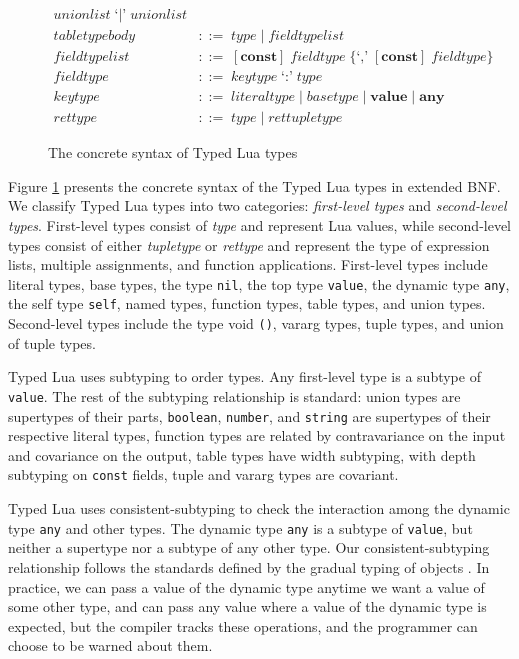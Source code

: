 \begin{figure}[!ht]
\begin{align*}
  \textit{unionlist} \; \texttt{`|'} \; \textit{unionlist}\\
\textit{tabletypebody} & ::= \; \textit{type} \; | \; \textit{fieldtypelist}\\
\textit{fieldtypelist} & ::= \; [\textbf{const}] \; \textit{fieldtype} \; \{\texttt{`,'} \; [\textbf{const}] \; \textit{fieldtype}\}\\ 
\textit{fieldtype} & ::= \; \textit{keytype} \; \texttt{`:'} \; \textit{type}\\
\textit{keytype} & ::= \; \textit{literaltype} \; | \;
  \textit{basetype} \; | \;
  \textbf{value} \; | \;
  \textbf{any}\\
\textit{rettype} & ::= \; \textit{type} \; | \; \textit{rettupletype}
\end{align*}
\dend
\caption{The concrete syntax of Typed Lua types}
\label{fig:types}
\end{figure}

Figure \ref{fig:types} presents the concrete syntax of the
Typed Lua types in extended BNF.
We classify Typed Lua types into two categories:
\emph{first-level types} and \emph{second-level types}.
First-level types consist of \emph{type} and represent Lua values,
while second-level types consist of either \emph{tupletype} or
\emph{rettype} and represent the type of expression lists,
multiple assignments, and function applications.
First-level types include literal types, base types, the type \texttt{nil},
the top type \texttt{value}, the dynamic type \texttt{any},
the self type \texttt{self}, named types, function types, table types,
and union types.
Second-level types include the type void \texttt{()},
vararg types, tuple types, and union of tuple types.

Typed Lua uses subtyping to order types.
Any first-level type is a subtype of \texttt{value}.
The rest of the subtyping relationship is standard:
union types are supertypes of their parts,
\texttt{boolean}, \texttt{number}, and \texttt{string} are supertypes
of their respective literal types,
function types are related by contravariance on the input
and covariance on the output, table types have width subtyping,
with depth subtyping on \texttt{const} fields, tuple and vararg types
are covariant.

Typed Lua uses consistent-subtyping to check the interaction among the
dynamic type \texttt{any} and other types.
The dynamic type \texttt{any} is a subtype of \texttt{value}, but neither
a supertype nor a subtype of any other type.
Our consistent-subtyping relationship follows the standards defined
by the gradual typing of objects \citep{siek2007objects,siek2013mutable}.
In practice, we can pass a value of the dynamic type anytime we want
a value of some other type, and can pass any value where a
value of the dynamic type is expected, but the compiler tracks these
operations, and the programmer can choose to be warned about them.

